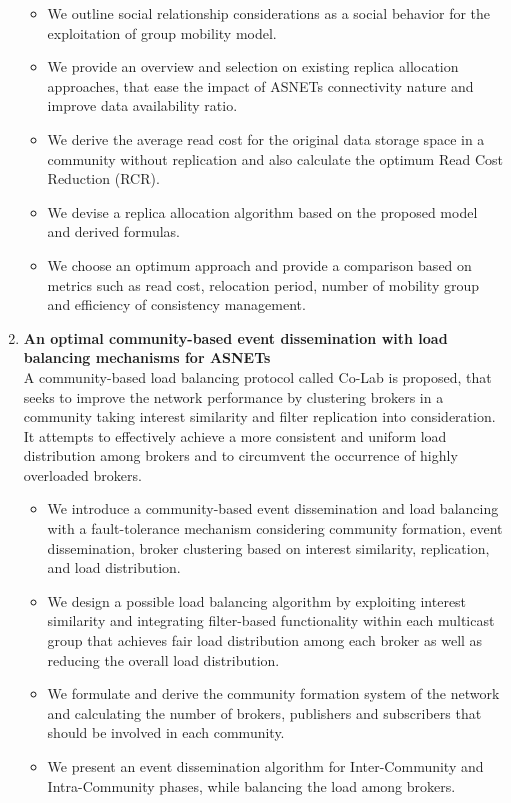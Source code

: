 \begin{enumerate}
\begin{itemize}
            \item We outline social relationship considerations as a social behavior for the exploitation of group mobility model.
            \item We provide an overview and selection on existing replica allocation approaches, that ease the impact of ASNETs connectivity nature and improve data availability ratio.
            \item We derive the average read cost for the original data storage space in a community without replication and also calculate the optimum Read Cost Reduction (RCR).
            \item We devise a replica allocation algorithm based on the proposed model and derived formulas.
            \item We choose an optimum approach and provide a comparison based on metrics such as read cost, relocation period, number of mobility group and efficiency of consistency management.
        \end{itemize}
    \item \textbf{An optimal community-based event dissemination with load balancing mechanisms for ASNETs }
    \\
    A community-based load balancing protocol called Co-Lab is proposed, that seeks to improve the network performance by clustering brokers in a community taking interest similarity and filter replication into consideration. It attempts to effectively achieve a more consistent and uniform load distribution among brokers and to circumvent the occurrence of highly overloaded brokers.
        \begin{itemize}
            \item We introduce a community-based event dissemination and load balancing with a fault-tolerance mechanism considering community formation, event dissemination, broker clustering based on interest similarity, replication, and load distribution.
            \item We design a possible load balancing algorithm by exploiting interest similarity and integrating filter-based functionality within each multicast group that achieves fair load distribution among each broker as well as reducing the overall load distribution.
            \item We formulate and derive the community formation system of the network and calculating the number of brokers, publishers and subscribers that should be involved in each community.
            \item We present an event dissemination algorithm for Inter-Community and Intra-Community phases, while balancing the load among brokers.

\end{itemize}
\end{enumerate}
